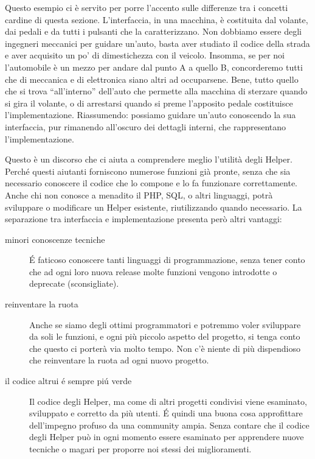 Questo esempio ci è servito per porre l'accento sulle differenze tra i concetti cardine di questa sezione. L'interfaccia, in una macchina, è costituita dal volante, dai pedali e da tutti i pulsanti che la caratterizzano. Non dobbiamo essere degli ingegneri meccanici per guidare un'auto, basta aver studiato il codice della strada e aver acquisito un po' di dimestichezza con il veicolo. Insomma, se per noi l'automobile è un mezzo per andare dal punto A a quello B, concorderemo tutti che di meccanica e di elettronica siano altri ad occuparsene. Bene, tutto quello che si trova ``all'interno'' dell'auto che permette alla macchina di sterzare quando si gira il volante, o di arrestarsi quando si preme l'apposito pedale costituisce l'implementazione. Riassumendo: possiamo guidare un'auto conoscendo la sua interfaccia, pur rimanendo all'oscuro dei dettagli interni, che rappresentano l'implementazione.

Questo è un discorso che ci aiuta a comprendere meglio l'utilità degli Helper. Perché questi aiutanti forniscono numerose funzioni già pronte, senza che sia necessario conoscere il codice che lo compone e lo fa funzionare correttamente. Anche chi non conosce a menadito il \ac{PHP}, \ac{SQL}, o altri linguaggi, potrà sviluppare o modificare un Helper esistente, riutilizzando quando necessario. La separazione tra interfaccia e implementazione presenta però altri vantaggi:

\begin{description}
\item[minori conoscenze tecniche] \'E faticoso conoscere tanti linguaggi di programmazione, senza tener conto che ad ogni loro nuova release molte funzioni vengono introdotte o deprecate (sconsigliate).
\item[reinventare la ruota] Anche se siamo degli ottimi programmatori e potremmo voler sviluppare da soli le funzioni, e ogni più piccolo aspetto del progetto, si tenga conto che questo ci porterà via molto tempo. Non c'è niente di più dispendioso che reinventare la ruota ad ogni nuovo progetto.
\item[il codice altrui \'e sempre pi\'u verde] Il codice degli Helper, ma come di altri progetti condivisi viene esaminato, sviluppato e corretto da più utenti. \'E quindi una buona cosa approfittare dell'impegno profuso da una community ampia. Senza contare che il codice degli Helper può in ogni momento essere esaminato per apprendere nuove tecniche o magari per proporre noi stessi dei miglioramenti.
\end{description}

